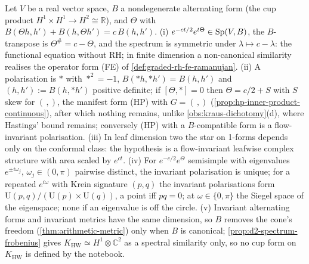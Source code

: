 \begin{theorem}
\label{thm:deninger-invariant-polarisation}
Let $V$ be a real vector space, $B$ a nondegenerate alternating form (the cup product $H^1\times H^1\to H^2\cong\mathbb R$),
and $\Theta$ with $B(\Theta h,h')+B(h,\Theta h') = c\,B(h,h')$. (i) $e^{-ct/2}e^{t\Theta}\in\mathrm{Sp}(V,B)$, the
$B$-transpose is $\Theta^\# = c-\Theta$, and the spectrum is symmetric under $\lambda\mapsto c-\lambda$: the functional
equation without RH; in finite dimension a non-canonical similarity realises the operator form (FE) of
\cref{def:graded-rh-fe-ramanujan}. (ii) A polarisation is $*$ with $*^2 = -1$, $B(*h,*h') = B(h,h')$ and
$(h,h') := B(h,*h')$ positive definite; if $[\Theta,*] = 0$ then $\Theta = c/2+S$ with $S$ skew for $(\,,)$, the
manifest form (HP) with $G = (\,,)$ (\cref{prop:hp-inner-product-continuous}), after which nothing remains, unlike
\cref{obs:kraus-dichotomy}(d), where Hastings' bound remains; conversely (HP) with a $B$-compatible form is a
flow-invariant polarisation. (iii) In leaf dimension two the star on 1-forms depends only on the conformal class:
the hypothesis is a flow-invariant leafwise complex structure with area scaled by $e^{ct}$. (iv) For
$e^{-c/2}e^\Theta$ semisimple with eigenvalues $e^{\pm i\omega_j}$, $\omega_j\in(0,\pi)$ pairwise distinct, the invariant
polarisation is unique; for a repeated $e^{i\omega}$ with Krein signature $(p,q)$ the invariant polarisations form
$\mathrm U(p,q)/(\mathrm U(p)\times\mathrm U(q))$, a point iff $pq = 0$; at $\omega\in\{0,\pi\}$ the Siegel space of the
eigenspace; none if an eigenvalue is off the circle. (v) Invariant alternating forms and invariant metrics have the
same dimension, so $B$ removes the cone's freedom (\cref{thm:arithmetic-metric}) only when $B$ is canonical;
\cref{prop:d2-spectrum-frobenius} gives $K_{\mathrm{HW}}\simeq H^1\otimes\mathbb C^2$ as a spectral similarity only, so no cup
form on $K_{\mathrm{HW}}$ is defined by the notebook.
\end{theorem}

